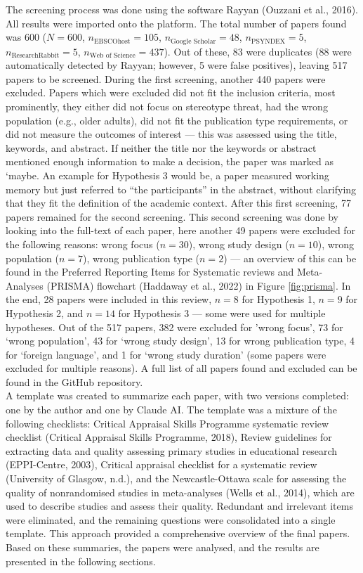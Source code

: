\documentclass[
  stu, a4paper, 12pt,mask,floatsintext]{apa7}
\begin{document}
The screening process was done using the software Rayyan (Ouzzani et al., 2016). All results were imported onto the platform.
The total number of papers found was 600 (\(N = 600\), \(n_{\text{EBSCOhost}} = 105\), \(n_{\text{Google Scholar}} = 48\), \(n_{\text{PSYNDEX}} = 5\), \(n_{\text{ResearchRabbit}} = 5\), \(n_{\text{Web of Science}} = 437\)). Out of these, 83 were duplicates (88 were automatically detected by Rayyan; however, 5 were false positives), leaving 517 papers to be screened. During the first screening, another 440 papers were excluded.
Papers which were excluded did not fit the inclusion criteria, most prominently, they either did not focus on stereotype threat, had the wrong population (e.g., older adults), did not fit the publication type requirements, or did not measure the outcomes of interest --- this was assessed using the title, keywords, and abstract. If neither the title nor the keywords or abstract mentioned enough information to make a decision, the paper was marked as `maybe.
An example for Hypothesis 3 would be, a paper measured working memory but just referred to ``the participants'' in the abstract, without clarifying that they fit the definition of the academic context. After this first screening, 77 papers remained for the second screening.
This second screening was done by looking into the full-text of each paper, here another 49 papers were excluded for the following reasons: wrong focus (\(n = 30\)), wrong study design (\(n = 10\)), wrong population (\(n = 7\)), wrong publication type (\(n = 2\)) --- an overview of this can be found in the Preferred Reporting Items for Systematic reviews and Meta-Analyses (PRISMA) flowchart (Haddaway et al., 2022) in Figure \ref{fig:prisma}.
In the end, 28 papers were included in this review, \(n = 8\) for Hypothesis 1, \(n = 9\) for Hypothesis 2, and \(n = 14\) for Hypothesis 3 --- some were used for multiple hypotheses. Out of the 517 papers, 382 were excluded for 'wrong focus', 73 for `wrong population', 43 for `wrong study design', 13 for wrong publication type, 4 for `foreign language', and 1 for `wrong study duration' (some papers were excluded for multiple reasons). A full list of all papers found and excluded can be found in the GitHub repository.\\
A template was created to summarize each paper, with two versions completed: one by the author and one by Claude AI.
The template was a mixture of the following checklists: Critical Appraisal Skills Programme systematic review checklist (Critical Appraisal Skills Programme, 2018), Review guidelines for extracting data and quality assessing primary studies in educational research (EPPI-Centre, 2003), Critical appraisal checklist for a systematic review (University of Glasgow, n.d.), and the Newcastle-Ottawa scale for assessing the quality of nonrandomised studies in meta-analyses (Wells et al., 2014), which are used to describe studies and assess their quality.
Redundant and irrelevant items were eliminated, and the remaining questions were consolidated into a single template.
This approach provided a comprehensive overview of the final papers.
Based on these summaries, the papers were analysed, and the results are presented in the following sections.
\end{document}
